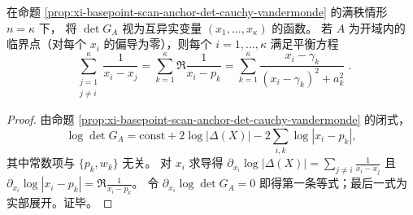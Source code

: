 \begin{proposition}\label{prop:xi-basepoint-scan-full-rank-anchor-critical-equations}
在命题 \ref{prop:xi-basepoint-scan-anchor-det-cauchy-vandermonde} 的满秩情形 \(n=\kappa\) 下，
将 \(\det G_A\) 视为互异实变量 \((x_1,\dots,x_\kappa)\) 的函数。
若 \(A\) 为开域内的临界点（对每个 \(x_i\) 的偏导为零），则每个 \(i=1,\dots,\kappa\) 满足平衡方程
\[
\boxed{\;
\sum_{\substack{j=1\\ j\ne i}}^{\kappa}\frac{1}{x_i-x_j}
=\sum_{k=1}^{\kappa}\Re\frac{1}{x_i-p_k}
=\sum_{k=1}^{\kappa}\frac{x_i-\gamma_k}{(x_i-\gamma_k)^2+a_k^2}\; }.
\]
\end{proposition}
\begin{proof}
由命题 \ref{prop:xi-basepoint-scan-anchor-det-cauchy-vandermonde} 的闭式，
\[
\log\det G_A=\mathrm{const}+2\log|\Delta(X)|-2\sum_{i,k}\log|x_i-p_k|,
\]
其中常数项与 \(\{p_k,w_k\}\) 无关。
对 \(x_i\) 求导得
\(
\partial_{x_i}\log|\Delta(X)|=\sum_{j\ne i}\frac{1}{x_i-x_j}
\)
且
\(
\partial_{x_i}\log|x_i-p_k|=\Re\frac{1}{x_i-p_k}
\)。
令 \(\partial_{x_i}\log\det G_A=0\) 即得第一条等式；最后一式为实部展开。证毕。
\end{proof}

